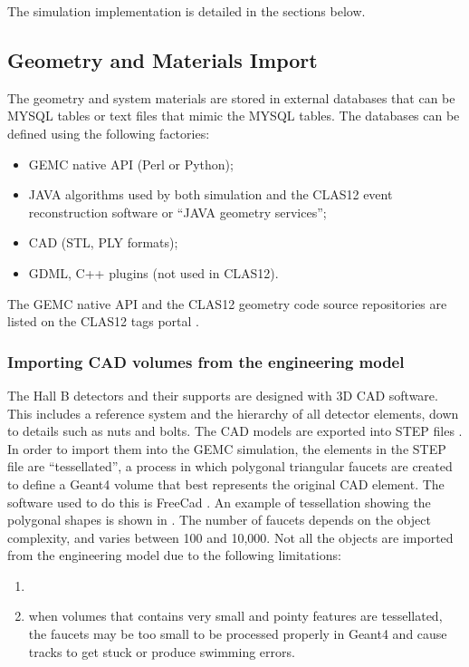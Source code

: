 The simulation implementation is detailed in the sections below.

\subsection{Geometry and Materials Import}

The geometry and system materials are stored in external databases that can be MYSQL tables or text files that
mimic the MYSQL tables. The databases can be defined using the following factories:

\begin{itemize}
	\item GEMC native API (Perl or Python);
	\item JAVA algorithms used by both simulation and the CLAS12 event reconstruction software \cite{recon-nim} or ``JAVA geometry services'';
	\item CAD (STL, PLY formats);
	\item GDML, C++ plugins (not used in CLAS12).
\end{itemize}



The GEMC native API and the CLAS12 geometry code source repositories are listed on the CLAS12
tags portal \cite{clas12Tags}.


\subsubsection{Importing CAD volumes from the engineering model}

The Hall B detectors and their supports are designed with 3D CAD software. This includes a reference system and the
hierarchy of all detector elements, down to details such as nuts and bolts.
The CAD models are exported into STEP files \cite{stepFiles}.
In order to import them into the GEMC simulation, the elements in the STEP file are ``tessellated'',
a process in which polygonal triangular faucets are created to define a Geant4 volume that best represents
the original CAD element.
The software used to do this is FreeCad \cite{freeCad}. An example of tessellation showing the polygonal shapes
is shown in . The number of faucets depends on the object complexity, and varies between
100 and 10,000.
Not all the objects are imported from the engineering model due to the following limitations:

\begin{enumerate}
\item
\item when volumes that contains very small and pointy features are tessellated, the faucets may be too small
      to be processed properly in Geant4 and cause tracks to get stuck or produce swimming errors.
\end{enumerate}

